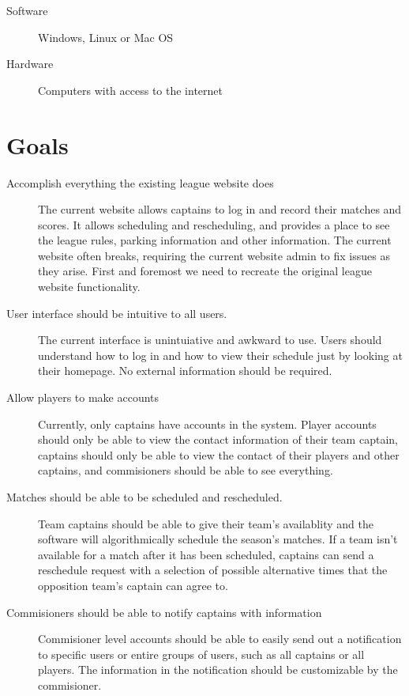 \documentclass{article}
\begin{document}
\begin{description}
    \item [Software] Windows, Linux or Mac OS
    \item [Hardware] Computers with access to the internet
\end{description}

\section{Goals}

\begin{description}
    \item [Accomplish everything the existing league website does]
    The current website allows captains to log in and record their matches
    and scores. It allows scheduling and rescheduling, and provides a place
    to see the league rules, parking information and other information. The
    current website often breaks, requiring the current website admin to fix
    issues as they arise. First and foremost we need to recreate the original
    league website functionality.
    \item [User interface should be intuitive to all users.] The current
    interface is unintuiative and awkward to use. Users should understand
    how to log in and how to view their schedule just by looking at their
    homepage. No external information should be required.
    \item [Allow players to make accounts] Currently, only captains have
    accounts in the system. Player accounts should only be able to view the
    contact information of their team captain, captains should only be able
    to view the contact of their players and other captains, and commisioners
    should be able to see everything.
    \item [Matches should be able to be scheduled and rescheduled.] 
    Team captains should be able to give their team's availablity and the
    software will algorithmically schedule the season's matches. If a team
    isn't available for a match after it has been scheduled, captains can
    send a reschedule request with a selection of possible alternative times
    that the opposition team's captain can agree to.
    \item [Commisioners should be able to notify captains with information]
    Commisioner level accounts should be able to easily send out a
    notification to specific users or entire groups of users, such as all
    captains or all players. The information in the notification should be
    customizable by the commisioner.
\end{description}
\end{document}
